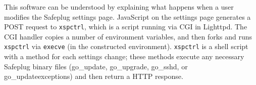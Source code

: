 \documentclass[letterpaper,twocolumn,10pt]{article}
\begin{document}
%

This software can be understood by explaining what happens when a user modifies the Safeplug settings page.  JavaScript on the settings page generates a POST request to {\tt xspctrl}, which is a script running via CGI in Lighttpd. The CGI handler copies a number of environment variables, and then forks and runs {\tt xspctrl} via {\tt execve} (in the constructed environment). {\tt xspctrl} is a shell script with a method for each settings change; these methods execute any necessary Safeplug binary files (go\_update, go\_upgrade, go\_sshd, or go\_updateexceptions) and then return a HTTP response.


    
\end{document}
